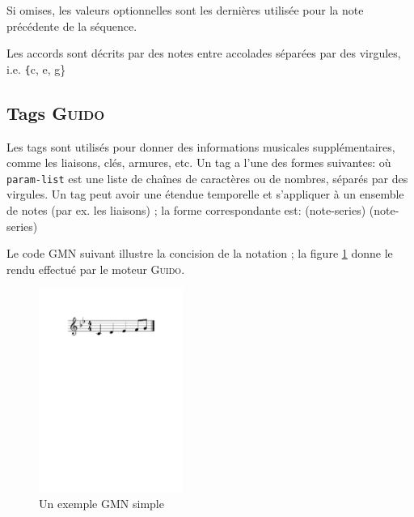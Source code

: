 \documentclass{article}
\newenvironment{gmncode}		{\vspace{-2mm}\small\verbatim}{\endverbatim\vspace{-2mm}}
\newcommand{\Guido}		{\textsc{Guido}}
\newcommand{\code}[1]		{{\small \texttt{#1}}}
\begin{document}
Si omises, les valeurs optionnelles sont les dernières utilisée pour la note précédente de la séquence.

Les accords sont décrits par des notes entre accolades séparées par des virgules, i.e. \code\{{c, e, g}\}


\subsection{Tags \Guido}
Les tags sont utilisés pour donner des informations musicales supplémentaires, comme les liaisons, clés, armures, etc. Un tag a l'une des formes suivantes:
\begin{gmncode} 
   \tagname 
\end{gmncode}
\noindent où \code{param-list} est une liste de chaînes de caractères ou de nombres, séparés par des virgules. Un tag peut avoir une étendue temporelle et s'appliquer à un ensemble de notes (par ex. les liaisons) ; la forme correspondante est:
\begin{gmncode} 
   \tagname(note-series)
   (note-series)
\end{gmncode} 

Le code GMN suivant illustre la concision de la notation ; la figure \ref{ex1} donne le rendu effectué par le moteur \Guido. 
\begin{gmncode} 
  [ \meter<"4/4"> \key<-2> c d e& f/8 g ]
\end{gmncode} 

\begin{figure}[h]
	\centering \includegraphics[width=47mm]{imgs/ex1}
 \caption{Un exemple GMN simple}
 \label{ex1}
\end{figure}
\end{document}
